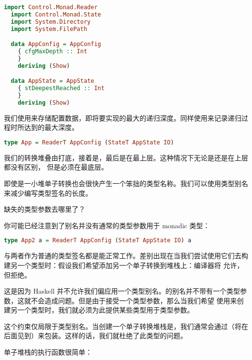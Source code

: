 \documentclass[./main.tex]{subfiles}
\begin{document}
\begin{lstlisting}[language=Haskell]
  import Control.Monad.Reader
  import Control.Monad.State
  import System.Directory
  import System.FilePath

  data AppConfig = AppConfig
    { cfgMaxDepth :: Int
    }
    deriving (Show)

  data AppState = AppState
    { stDeepestReached :: Int
    }
    deriving (Show)
\end{lstlisting}

我们使用来存储配置数据，即将要实现的最大的递归深度。同样使用来记录递归过程时所达到的最大深度。

\begin{lstlisting}[language=Haskell]
  type App = ReaderT AppConfig (StateT AppState IO)
\end{lstlisting}

我们的转换堆叠由打底，接着是，最后是在最上层。这种情况下无论是还是在上层都没有区别，
但是必须在最底层。

即使是一小堆单子转换也会很快产生一个笨拙的类型名称。我们可以使用类型别名来减少编写类型签名的长度。

\begin{anote}
  缺失的类型参数去哪里了？

  你可能已经注意到了别名并没有通常的类型参数用于 monadic 类型：

  \begin{lstlisting}[language=Haskell]
    type App2 a = ReaderT AppConfig (StateT AppState IO) a
  \end{lstlisting}

  与两者作为普通的类型签名都是能正常工作。差别出现在当我们尝试使用它们去构建另一个类型时：假设我们希望添加另一个单子转换到堆栈上：编译器将
  允许，但拒绝。

  这是因为 Haskell 并不允许我们偏应用一个类型别名。的别名并不带有一个类型参数，这就不会造成问题。但是由于接受一个类型参数，那么当我们希望
  使用来创建另一个类型时，我们就必须为此提供某些类型用于类型参数。

  这个约束仅局限于类型别名。当创建一个单子转换堆栈是，我们通常会通过（将在后面见到）来包装。这样的话，我们就杜绝了此类型的问题。
\end{anote}

单子堆栈的执行函数很简单：
\end{document}
